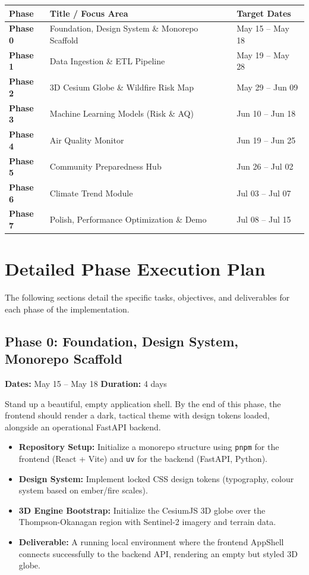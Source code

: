 \documentclass[12pt,letterpaper]{article}
\begin{document}
\vspace{0.5cm}
\noindent
\begin{tabularx}{\textwidth}{@{} >{\bfseries}l X l @{}}
\toprule
\textbf{Phase} & \textbf{Title / Focus Area} & \textbf{Target Dates} \\
\midrule
Phase 0 & Foundation, Design System \& Monorepo Scaffold & May 15 -- May 18 \\
Phase 1 & Data Ingestion \& ETL Pipeline & May 19 -- May 28 \\
Phase 2 & 3D Cesium Globe \& Wildfire Risk Map & May 29 -- Jun 09 \\
Phase 3 & Machine Learning Models (Risk \& AQ) & Jun 10 -- Jun 18 \\
Phase 4 & Air Quality Monitor & Jun 19 -- Jun 25 \\
Phase 5 & Community Preparedness Hub & Jun 26 -- Jul 02 \\
Phase 6 & Climate Trend Module & Jul 03 -- Jul 07 \\
Phase 7 & Polish, Performance Optimization \& Demo & Jul 08 -- Jul 15 \\
\bottomrule
\end{tabularx}
\vspace{0.5cm}

\newpage
\section{Detailed Phase Execution Plan}
The following sections detail the specific tasks, objectives, and deliverables for each phase of the implementation.

\subsection*{Phase 0: Foundation, Design System, Monorepo Scaffold}
\textbf{Dates:} May 15 -- May 18 \hfill \textbf{Duration:} 4 days

\begin{goalbox}
Stand up a beautiful, empty application shell. By the end of this phase, the frontend should render a dark, tactical theme with design tokens loaded, alongside an operational FastAPI backend.
\end{goalbox}

\begin{itemize}
    \item \textbf{Repository Setup:} Initialize a monorepo structure using \texttt{pnpm} for the frontend (React + Vite) and \texttt{uv} for the backend (FastAPI, Python).
    \item \textbf{Design System:} Implement locked CSS design tokens (typography, colour system based on ember/fire scales).
    \item \textbf{3D Engine Bootstrap:} Initialize the CesiumJS 3D globe over the Thompson-Okanagan region with Sentinel-2 imagery and terrain data.
    \item \textbf{Deliverable:} A running local environment where the frontend AppShell connects successfully to the backend API, rendering an empty but styled 3D globe.
\end{itemize}
\end{document}
